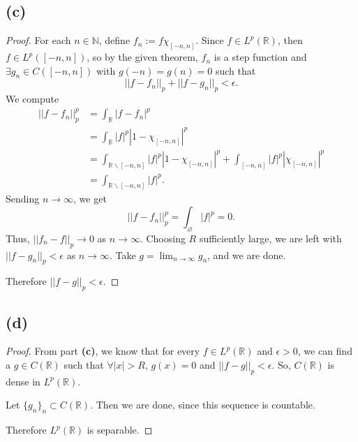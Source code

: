 \documentclass{article}
\newcommand{\R}{\mathbb{R}} %
\newcommand{\N}{\mathbb{N}} %
\begin{document}
\subsection*{(c)}
\begin{proof}
	For each $n \in \N$, define $f_n := f \chi_{[-n, n]}$. Since $f \in L^p(\R)$, then $f\in L^p([-n, n])$, so by the given theorem, $f_n$ is a step function and $\exists g_n \in C([-n, n])$ with $g(-n) = g(n) = 0$ such that
	\begin{equation}
		||f - f_n||_p + ||f - g_n||_p < \epsilon.
	\end{equation}
	We compute
	\begin{align}
		||f - f_n||_p ^p &= \int_{\R} |f - f_n|^p \\
		&= \int_{\R} |f|^p |1 - \chi_{[-n, n]}|^p \\
		&= \int_{\R \backslash [-n, n]} |f|^p |1 - \chi_{[-n, n]}|^p + \int_{[-n, n]} |f|^p |\chi_{[-n, n]}|^p \\
		&= \int_{\R \backslash [-n, n]} |f|^p.
	\end{align}
	Sending $n \to \infty$, we get
	\begin{equation}
		||f - f_n||_p ^p = \int_{\varnothing}|f|^p = 0.
	\end{equation}
	Thus, $||f_n - f||_p \to 0$ as $n \to \infty$. Choosing $R$ sufficiently large, we are left with $||f - g_n||_p < \epsilon$ as $n \to \infty$. Take $g = \lim_{n \to \infty} g_n$, and we are done.
	
	Therefore $||f - g||_p < \epsilon$.
\end{proof}

\subsection*{(d)}
\begin{proof}
	From part \textbf{(c)}, we know that for every $f \in L^p(\R)$ and $\epsilon > 0$, we can find a $g \in C(\R)$ such that $\forall |x| > R$, $g(x)=0$ and $||f - g||_p < \epsilon$. So, $C(\R)$ is dense in $L^p(\R)$.
	
	Let $\{g_n\}_n \subset C(\R)$. Then we are done, since this sequence is countable.
	
	Therefore $L^p(\R)$ is separable.
\end{proof}
\end{document}
